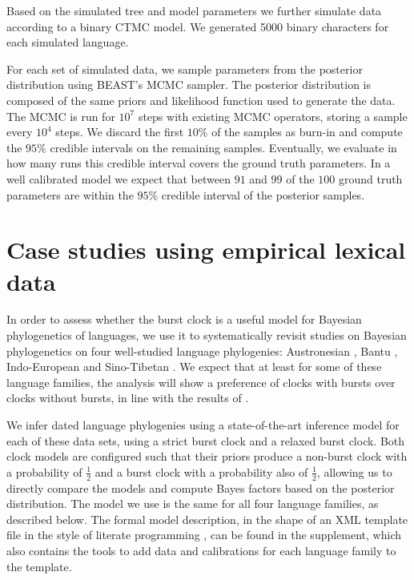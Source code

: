 \documentclass[]{rsos}%
\begin{document}
Based on the simulated tree and model parameters we further simulate data according to a binary CTMC model. We generated 5000 binary characters for each simulated language.

For each set of simulated data, we sample parameters from the posterior distribution using BEAST's MCMC sampler. The posterior distribution is composed of the same priors and likelihood function used to generate the data.
The MCMC is run for $10^7$ steps with existing MCMC operators, storing a sample every $10^4$ steps. We discard the first $10\%$ of the samples as burn-in and compute the $95\%$ credible intervals on the remaining samples. Eventually, we evaluate in how many runs this credible interval covers the ground truth parameters. In a well calibrated model we expect that between $91$ and $99$ of the $100$ ground truth parameters are within the $95\%$ credible interval of the posterior samples.

\section{Case studies using empirical lexical data}
\label{s:lexical}

In order to assess whether the burst clock is a useful model for Bayesian
phylogenetics of languages, we use it to systematically revisit studies on Bayesian phylogenetics
on four well-studied language phylogenies:
Austronesian
\parencite{gray2009language,greenhill2017evolutionary,greenhill2018population},
Bantu
\parencite{grollemund2015bantu,greenhill2018population,currie2013cultural},
Indo-European
\parencite{bouckaert2012mapping,chang2015ancestryconstrained,gray2003language,holm2017steppe,rama2018three,willems2016using}
and
Sino-Tibetan \parencite{sagart2019dated,zhang2019phylogenetic}.
We expect that at least for some of these language families, the analysis will show
a preference of clocks with bursts over clocks without bursts,
in line with the results of \textcite{atkinson2008languages}.

We infer dated language phylogenies using a state-of-the-art inference model for each of these data sets, using a strict burst clock and a relaxed burst clock.
Both clock models are configured such that their priors produce a non-burst clock with a
probability of $\frac{1}{2}$ and a burst clock with a probability also of
$\frac{1}{2}$, allowing us to directly compare the models and compute Bayes factors based on the posterior
distribution.
The model we use is the same for all four language families, as described below.
The formal model description, in the shape of an XML template file in the
style of literate programming \parencite{knuth1984literate}, can be found in the supplement,
which also contains the tools to add data and calibrations for each language
family to the template. 
\end{document}
